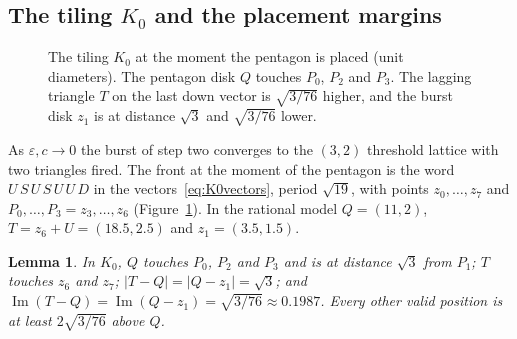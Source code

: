 \documentclass[11pt]{amsart}
\newtheorem{lemma}{Lemma}[section]
\theoremstyle{definition}
\newcommand{\eps}{\varepsilon}
\DeclareMathOperator{\Imag}{Im}
\begin{document}
\subsection{The tiling \texorpdfstring{$K_0$}{K0} and the placement margins}
\begin{figure}[t]
\centering
{}
\caption{The tiling $K_0$ at the moment the pentagon is placed (unit diameters). The pentagon disk $Q$
touches $P_0$, $P_2$ and $P_3$. The lagging triangle $T$ on the last down vector is $\sqrt{3/76}$ higher,
and the burst disk $z_1$ is at distance $\sqrt3$ and $\sqrt{3/76}$ lower.}\label{fig:K0}
\end{figure}

As $\eps,c\to0$ the burst of step two converges to the $(3,2)$ threshold lattice with two triangles fired.
The front at the moment of the pentagon is the word $U\,S\,U\,S\,U\,U\,D$ in the vectors~\eqref{eq:K0vectors},
period $\sqrt{19}$, with points $z_0,\dots,z_7$ and $P_0,\dots,P_3=z_3,\dots,z_6$ (Figure~\ref{fig:K0}). In the
rational model $Q=(11,2)$, $T=z_6+U=(18.5,2.5)$ and $z_1=(3.5,1.5)$.

\begin{lemma}\label{lem:K0}
In $K_0$, $Q$ touches $P_0$, $P_2$ and $P_3$ and is at distance $\sqrt3$ from $P_1$; $T$ touches $z_6$ and $z_7$;
$|T-Q|=|Q-z_1|=\sqrt3$; and $\Imag(T-Q)=\Imag(Q-z_1)=\sqrt{3/76}\approx0.1987$. Every other valid position is
at least $2\sqrt{3/76}$ above $Q$.
\end{lemma}
\end{document}
